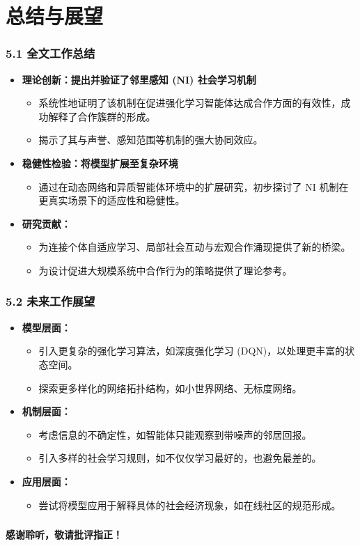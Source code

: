 \documentclass[UTF8]{beamer}
\begin{document}
\section{总结与展望}
\begin{frame}
    \frametitle{5.1 全文工作总结}
    \begin{itemize}
        \item \textbf{理论创新：提出并验证了邻里感知 (NI) 社会学习机制}
        \begin{itemize}
            \item 系统性地证明了该机制在促进强化学习智能体达成合作方面的有效性，成功解释了合作簇群的形成。
            \item 揭示了其与声誉、感知范围等机制的强大协同效应。
        \end{itemize}
        \pause
        \item \textbf{稳健性检验：将模型扩展至复杂环境}
        \begin{itemize}
            \item 通过在动态网络和异质智能体环境中的扩展研究，初步探讨了 NI 机制在更真实场景下的适应性和稳健性。
        \end{itemize}
        \pause
        \item \textbf{研究贡献：}
        \begin{itemize}
            \item 为连接个体自适应学习、局部社会互动与宏观合作涌现提供了新的桥梁。
            \item 为设计促进大规模系统中合作行为的策略提供了理论参考。
        \end{itemize}
    \end{itemize}
\end{frame}

\begin{frame}
    \frametitle{5.2 未来工作展望}
    \begin{itemize}
        \item \textbf{模型层面：}
        \begin{itemize}
            \item 引入更复杂的强化学习算法，如深度强化学习 (DQN)，以处理更丰富的状态空间。
            \item 探索更多样化的网络拓扑结构，如小世界网络、无标度网络。
        \end{itemize}
        \item \textbf{机制层面：}
        \begin{itemize}
            \item 考虑信息的不确定性，如智能体只能观察到带噪声的邻居回报。
            \item 引入多样的社会学习规则，如不仅仅学习最好的，也避免最差的。
        \end{itemize}
        \item \textbf{应用层面：}
        \begin{itemize}
            \item 尝试将模型应用于解释具体的社会经济现象，如在线社区的规范形成。
        \end{itemize}
    \end{itemize}
\end{frame}


\begin{frame}
    \frametitle{} %
    \begin{center}
        \Huge \textbf{感谢聆听，敬请批评指正！}
    \end{center}
\end{frame}
\end{document}
